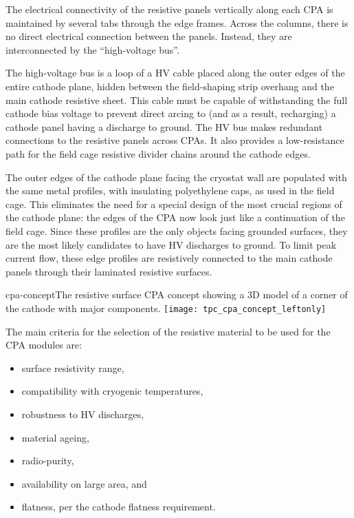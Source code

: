 The electrical connectivity of the resistive panels vertically along each CPA is maintained by several tabs through the edge frames.  Across the columns, there is no direct electrical connection between the panels.  Instead, they are interconnected by the ``high-voltage bus''. 

The high-voltage bus is a loop of a HV cable placed along the outer edges of the entire cathode plane, hidden between the field-shaping strip overhang and the main cathode resistive sheet.  This cable must be capable of withstanding the full cathode bias voltage to prevent direct arcing to (and as a result, recharging) a cathode panel having a discharge to ground. 
 The HV bus makes redundant connections to the resistive panels across CPAs.   It also provides a low-resistance path for the field cage resistive divider chains around the cathode edges.

The outer edges of the cathode plane facing the cryostat wall are populated with the same metal profiles, with insulating polyethylene caps, as used in the field cage.  This eliminates the need for a special design of the most crucial regions of the cathode plane: the edges of the CPA now look just like a continuation of the field cage.  Since these profiles are the only objects facing grounded surfaces, they are the most likely candidates to have HV discharges to ground.   To limit peak current flow, these edge profiles are resistively connected to the main cathode panels through their laminated resistive surfaces.  

\begin{cdrfigure}{cpa-concept}{The resistive surface CPA concept showing  
 a 3D model of a corner of the cathode with major components.} 
\texttt{[image: tpc\_cpa\_concept\_leftonly]}
\end{cdrfigure}




The main criteria for the selection of the resistive material to be used for the CPA modules are: 
\begin{itemize}	
\item surface resistivity range,
\item compatibility with cryogenic temperatures,
\item robustness to HV discharges, 
\item material ageing,
\item radio-purity,
\item availability on large area,  and 
\item flatness, per the cathode flatness requirement. 
\end{itemize}


